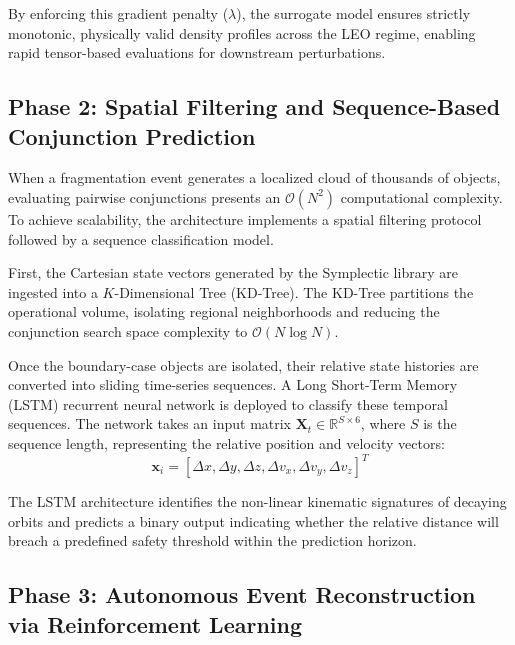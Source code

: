 \documentclass[letterpaper, paper,11pt]{AAS}
\begin{document}
By enforcing this gradient penalty ($\lambda$), the surrogate model ensures strictly monotonic, physically valid density profiles across the LEO regime, enabling rapid tensor-based evaluations for downstream perturbations.

\subsection{Phase 2: Spatial Filtering and Sequence-Based Conjunction Prediction}
\label{subsec:method_phase2}

When a fragmentation event generates a localized cloud of thousands of objects, evaluating pairwise conjunctions presents an $\mathcal{O}(N^2)$ computational complexity. To achieve scalability, the architecture implements a spatial filtering protocol followed by a sequence classification model.

First, the Cartesian state vectors generated by the Symplectic library are ingested into a $K$-Dimensional Tree (KD-Tree). The KD-Tree partitions the operational volume, isolating regional neighborhoods and reducing the conjunction search space complexity to $\mathcal{O}(N \log N)$. 

Once the boundary-case objects are isolated, their relative state histories are converted into sliding time-series sequences. A Long Short-Term Memory (LSTM) recurrent neural network is deployed to classify these temporal sequences. The network takes an input matrix $\mathbf{X}_t \in \mathbb{R}^{S \times 6}$, where $S$ is the sequence length, representing the relative position and velocity vectors:
$$ \mathbf{x}_i = [\Delta x, \Delta y, \Delta z, \Delta v_x, \Delta v_y, \Delta v_z]^T $$

The LSTM architecture identifies the non-linear kinematic signatures of decaying orbits and predicts a binary output indicating whether the relative distance will breach a predefined safety threshold within the prediction horizon.

\subsection{Phase 3: Autonomous Event Reconstruction via Reinforcement Learning}
\label{subsec:method_phase3}
\end{document}

